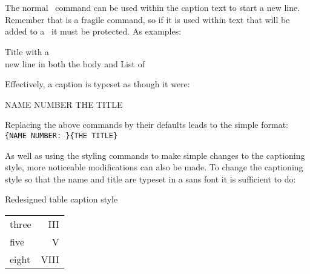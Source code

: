 \begin{syntax}
\cmd{\\} \\
\cmd{\\*} \\
\end{syntax}
 The normal \ltx\  command \cmd{\\} can be used within the
caption text to start a new line. Remember that \cmd{\\} is a fragile 
command, so if it is used within text that will be added to a \listofx\
it must be protected.
 As examples: 
\begin{lcode}
\caption{Title with a \protect\\ new line in 
         both the body and List of}
\caption[List of entry with no new line]%
        {Title with a \\ new line}
\caption[List of entry with a \protect\\ new line]%
        {Title text}
\end{lcode}

 Effectively, a caption is typeset as though it were:
 \begin{lcode}
 \precaption
 {\captionnamefont NAME NUMBER\captiondelim}
 {\captionstyle\captiontitlefont THE TITLE\captiontitlefinal}
 \postcaption
 \end{lcode}
 Replacing the above commands by their defaults leads to the simple
 format: \\
 \verb?{NAME NUMBER: }{THE TITLE}?

 As well as using the styling commands to make simple changes to the
captioning style, more noticeable modifications can also be made.
To change the captioning style so that the name and title are typeset in
a sans font\index{caption!font} it is sufficient to do:
 \begin{lcode}
 \captionnamefont{\sffamily}
 \captiontitlefont{\sffamily}
 \end{lcode}

 \begin{shadetable}
 \captionnamefont{\sffamily}
 \captiondelim{}
 \captionstyle{\\}
 \captiontitlefont{\scshape}
 \setlength{\belowcaptionskip}{10pt}
 \caption{Redesigned table caption style} \label{tab:style}
 \begin{tabular}{lr} \toprule
  three & III \\
  five  & V \\
  eight & VIII \\ \bottomrule
  \end{tabular}
 \end{shadetable}

